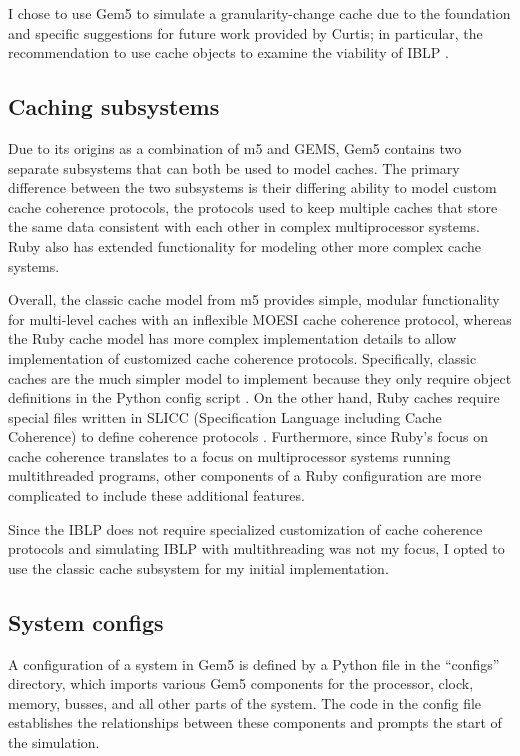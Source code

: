 \documentclass[12pt,twoside]{reedthesis}
\begin{document}
I chose to use Gem5 to simulate a granularity-change cache due to the foundation and specific suggestions for future work provided by Curtis; in particular, the recommendation to use cache objects to examine the viability of IBLP \cite{curtis}.

	\subsection*{Caching subsystems}

	Due to its origins as a combination of m5 and GEMS, Gem5 contains two separate subsystems that can both be used to model caches. The primary difference between the two subsystems is their differing ability to model custom cache coherence protocols, the protocols used to keep multiple caches that store the same data consistent with each other in complex multiprocessor systems. Ruby also has extended functionality for modeling other more complex cache systems.
	
	Overall, the classic cache model from m5 provides simple, modular functionality for multi-level caches with an inflexible MOESI cache coherence protocol, whereas the Ruby cache model has more complex implementation details to allow implementation of customized cache coherence protocols. Specifically, classic caches are the much simpler model to implement because they only require object definitions in the Python config script \cite{gem5-tutorial}. On the other hand, Ruby caches require special files written in SLICC (Specification Language including Cache Coherence) to define coherence protocols \cite{gem5-ruby}. Furthermore, since Ruby's focus on cache coherence translates to a focus on multiprocessor systems running multithreaded programs, other components of a Ruby configuration are more complicated to include these additional features.

	Since the IBLP does not require specialized customization of cache coherence protocols and simulating IBLP with multithreading was not my focus, I opted to use the classic cache subsystem for my initial implementation.

	\subsection*{System configs}

	A configuration of a system in Gem5 is defined by a Python file in the ``configs'' directory, which imports various Gem5 components for the processor, clock, memory, busses, and all other parts of the system. The code in the config file establishes the relationships between these components and prompts the start of the simulation.
\end{document}
